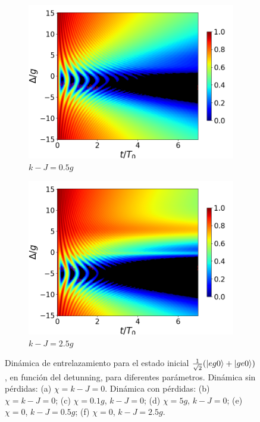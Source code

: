 \begin{figure}[h!]
\begin{subfigure}{0.49\textwidth}
    \end{subfigure}
    \vfill
    \begin{subfigure}{0.49\textwidth}
        \includegraphics[width=\textwidth]{figuras/ch4/concu/delta/eg0+ge0 k=0.5g x=0.0g J=0.0g gamma=0.25g concu delta dis.png}
        \caption{$k-J=0.5g$}
        \label{fig4:concu detunning k1}
    \end{subfigure}
    \hfill
    \begin{subfigure}{0.49\textwidth}
        \includegraphics[width=\textwidth]{figuras/ch4/concu/delta/eg0+ge0 k=2.5g x=0.0g J=0.0g gamma=0.25g concu delta dis.png}
        \caption{$k-J=2.5g$}
        \label{fig4:concu detunning k2}
    \end{subfigure}
    \caption{Dinámica de entrelazamiento para el estado inicial $\frac{1}{\sqrt{2}}(\ket{eg0}+\ket{ge0})$, en función del detunning, para diferentes parámetros. Dinámica sin pérdidas: (a) $\chi=k-J=0$. Dinámica con pérdidas: (b) $\chi=k-J=0$; (c) $\chi=0.1g$, $k-J=0$; (d) $\chi=5g$, $k-J=0$; (e) $\chi=0$, $k-J=0.5g$; (f) $\chi=0$, $k-J=2.5g$.}
    \label{fig4:concu detunning 0}
\end{figure}
